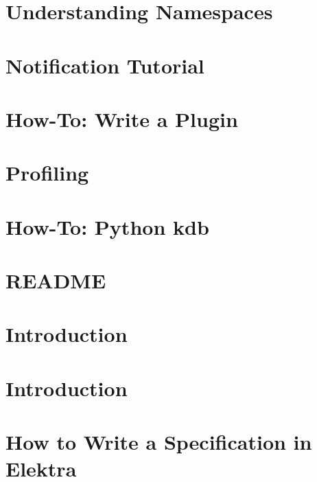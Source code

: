 \let\mypdfximage\pdfximage\def\pdfximage{\immediate\mypdfximage}\documentclass[twoside]{book}
\newcommand{\+}{\discretionary{\mbox{\scriptsize$\hookleftarrow$}}{}{}}
\begin{document}
\chapter{Understanding Namespaces}
\label{doc_tutorials_namespaces_md}

\chapter{Notification Tutorial}
\label{doc_tutorials_notifications_md}

\chapter{How-\/\+To\+: Write a Plugin}
\label{doc_tutorials_plugins_md}

\chapter{Profiling}
\label{doc_tutorials_profiling_md}

\chapter{How-\/\+To\+: Python kdb}
\label{doc_tutorials_python-kdb_md}

\chapter{README}
\label{md_doc_tutorials_README}

\chapter{Introduction}
\label{doc_tutorials_run_all_tests_with_docker_md}

\chapter{Introduction}
\label{doc_tutorials_run_reformatting_script_with_docker_md}

\chapter{How to Write a Specification in Elektra}
\label{doc_tutorials_specification_md}

\end{document}
